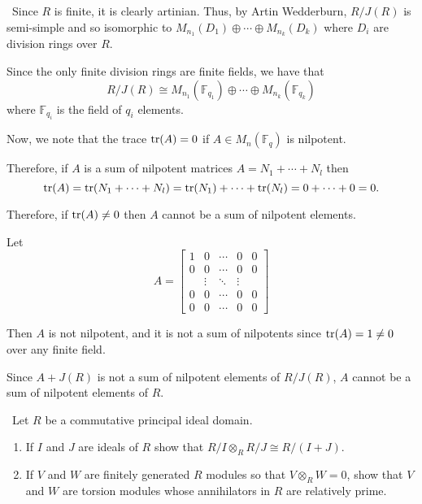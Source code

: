 \documentclass[12pt]{AlgebraQual}
\begin{document}
\begin{solution}$\,$
Since $R$ is finite, it is clearly artinian. Thus, by Artin Wedderburn, $R/J(R)$ is semi-simple and so isomorphic to $M_{n_1}(D_1)\oplus\cdots\oplus M_{n_k}(D_k)$ where $D_i$ are division rings over $R$.

Since the only finite division rings are finite fields, we have that $$R/J(R)\cong M_{n_1}(\mathbb{F}_{q_1})\oplus\cdots\oplus  M_{n_k}(\mathbb{F}_{q_k})$$ where $\mathbb{F}_{q_i}$ is the field of $q_i$ elements.

Now, we note that the trace $\text{tr}(A)=0$ if $A\in M_n(\mathbb{F}_q)$ is nilpotent.

Therefore, if $A$ is a sum of nilpotent matrices $A=N_1+\cdots+N_l$ then $$\text{tr}(A)=\text{tr}(N_1+\cdots+N_l)=\text{tr}(N_1)+\cdots+\text{tr}(N_l)=0+\cdots+0=0.$$

Therefore, if $\text{tr}(A)\not=0$ then $A$ cannot be a sum of nilpotent elements.

Let $$A=\begin{bmatrix}
1 & 0 & \cdots & 0 & 0\\
0 & 0 &\cdots & 0 & 0\\
& \vdots & \ddots & \vdots & \\
0 & 0 & \cdots & 0 & 0\\
0 & 0 & \cdots & 0 & 0
\end{bmatrix}$$

Then $A$ is not nilpotent, and it is not a sum of nilpotents since $\text{tr}(A)=1\not=0$ over any finite field.

Since $A+J(R)$ is not a sum of nilpotent elements of $R/J(R)$, $A$ cannot be a sum of nilpotent elements of $R.$
\end{solution}
\newpage




\begin{problem} $\,$
Let $R$ be a commutative principal ideal domain.
\begin{enumerate}[label=(\alph*)]
    \item If $I$ and $J$ are ideals of $R$ show that $R/I\otimes_R R/J\cong R/(I+J)$.
    \item If $V$ and $W$ are finitely generated $R$ modules so that $V\otimes_RW=0$, show that $V$ and $W$ are torsion modules whose annihilators in $R$ are relatively prime.
\end{enumerate}
\end{problem}
\end{document}
